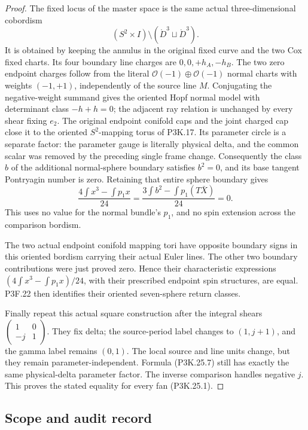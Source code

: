 \begin{proof}
The fixed locus of the master space is the same actual
three-dimensional cobordism
\[
 (S^2\times I)\setminus
                   (\mathring D^3\sqcup\mathring D^3).
\]
It is obtained by keeping the annulus in the original fixed
curve and the two Cox fixed charts. Its four boundary
line charges are \(0,0,+h_A,-h_B\).
The two zero endpoint charges follow from the literal
\(\mathcal O(-1)\oplus\mathcal O(-1)\) normal charts with
weights \((-1,+1)\), independently of the source line \(M\).
Conjugating the negative-weight summand gives the oriented
Hopf normal model with determinant class
\(-h+h=0\); the adjacent ray relation is unchanged by
every shear fixing \(e_2\).
The original endpoint conifold caps and the joint charged
cap close it to the oriented \(S^2\)-mapping torus of P3K.17.
Its parameter circle is a separate factor: the parameter
gauge is literally physical delta, and the common scalar was
removed by the preceding single frame change. Consequently
the class \(b\) of the additional normal-sphere boundary
satisfies \(b^2=0\), and its base tangent Pontryagin number
is zero. Retaining that entire sphere boundary gives
\[
 \frac{4\int x^3-\int p_1x}{24}
       =\frac{3\int b^2-\int p_1(T\bar X)}{24}=0.
                                                        \tag{P3K.25.10}
\]
This uses no value for the normal bundle's \(p_1\), and no
spin extension across the comparison bordism.

The two actual endpoint conifold mapping tori have opposite
boundary signs in this oriented bordism carrying their
actual Euler lines. The other two boundary contributions
were just proved zero. Hence their characteristic expressions
\((4\int x^3-\int p_1x)/24\), with their prescribed endpoint
spin structures, are equal. P3F.22 then identifies their
oriented seven-sphere return classes.

Finally repeat this actual square construction after the
integral shears
\(\left(\begin{smallmatrix}1&0\\-j&1\end{smallmatrix}\right)\).
They fix delta; the source-period label changes to
\((1,j+1)\), and the gamma label remains \((0,1)\).
The local source and line units change, but they remain
parameter-independent. Formula (P3K.25.7) still has exactly
the same physical-delta parameter factor. The inverse
comparison handles negative \(j\). This proves the stated
equality for every fan (P3K.25.1).
\end{proof}
\subsection{Scope and audit record}

